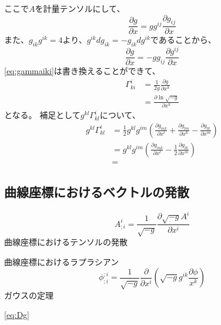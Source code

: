 \documentclass{jsarticle}
\newcommand{\pder}[2][]{\frac{\partial#1}{\partial#2}}
\begin{document}
ここで$A$を計量テンソルにして、
\begin{equation}
    \frac{\partial{g}}{\partial{x}} = gg^{ij}\frac{\partial{g_{ij}}}{\partial{x}} 
\end{equation}
また、$g_{ik}g^{ik}=4$より、$g^{ik}dg_{ik}=-g_{ik}dg^{ik}$であることから、
\begin{equation}
    \frac{\partial{g}}{\partial{x}} = -gg_{ij}\frac{\partial{g^{ij}}}{\partial{x}} 
\end{equation}
\eqref{eq:gammaiki}は書き換えることができて、
\begin{align}
    \Gamma^{i}_{ki} &= \frac{1}{2g}\pder[g]{x^k}\\%
                    &= \pder[\ln{\sqrt{-g}}]{x^k}
\end{align}
となる。
補足として$g^{kl}\Gamma^{i}_{kl}$について、
\begin{align}
    g^{kl}\Gamma^{i}_{kl} &=
    \frac{1}{2}g^{kl}g^{im} 
    \left(
    \frac{\partial{g_{mk}}}{\partial{x^{l}}}
     +
    \frac{\partial{g_{lm}}}{\partial{x^{k}}}
     -
    \frac{\partial{g_{lk}}}{\partial{x^{m}}}
    \right)\\
    &=
    g^{kl}g^{im} 
    \left(
    \frac{\partial{g_{mk}}}{\partial{x^{l}}}
     -
    \frac{1}{2}\frac{\partial{g_{lk}}}{\partial{x^{m}}}
    \right)\\
    &= 
\end{align}

\subsection{曲線座標におけるベクトルの発散}
\begin{equation}
    A^{i}_{;i} = 
    \frac{1}{\sqrt{-g}}\frac{\partial \sqrt{-g}A^{i}}{\partial{x^{i}}}
\end{equation}
曲線座標におけるテンソルの発散


曲線座標におけるラプラシアン
\begin{equation}
    \phi^{;i}_{;i} = 
    \frac{1}{\sqrt{-g}}
    \frac{\partial}{\partial{x^{i}}}
    \left(
        \sqrt{-g}g^{ik} \frac{\partial\phi}{x^{k}}
    \right)
\end{equation}
ガウスの定理


\ref{eq:Dg}
\end{document}
